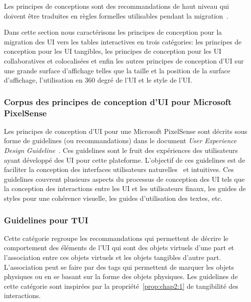 
Les principes de conceptions sont des recommandations de haut niveau qui doivent être traduites en règles formelles utilisables pendant la migration~\cite{Vanderdonckt1997}.

Dans cette section nous caractérisons les principes de conception pour la migration des UI vers les tables interactives en trois catégories: les principes de conception pour les UI tangibles, les principes de conception pour les UI collaboratives et colocalisées et enfin les autres principes de conception d'UI sur une grande surface d'affichage telles que la taille et la position de la surface d'affichage, l'utilisation en 360 degré de l'UI et le style de l'UI.

\subsubsection{Corpus des principes de conception d'UI pour Microsoft PixelSense}
\label{sec:chap2:3:5:1}
Les principes de conception d'UI pour une Microsoft PixelSense sont décrits sous forme de guidelines (ou recommandations) dans le document \textit{User Experience Design Guideline}~\cite{Microsoft2011}. Ces guidelines sont le fruit des expériences des utilisateurs ayant développé des UI pour cette plateforme. L'objectif de ces guidelines est de faciliter la conception des interfaces utilisateurs naturelles~\cite{Steinberg2012} et intuitives. Ces guidelines couvrent plusieurs aspects du processus de conception des UI tels que la conception des interactions entre les UI et les utilisateurs finaux, les guides de styles pour une cohérence visuelle, les guides d'utilisation des textes, etc. 

\subsubsection{Guidelines pour TUI}
\label{sec:chap2:3:5:2}
Cette catégorie regroupe les recommandations qui permettent de décrire le comportement des éléments de l'UI qui sont des objets virtuels d'une part et l'association entre ces objets virtuels et les objets tangibles d'autre part. L'association peut se faire par des tags qui permettent de marquer les objets physiques ou en se basant sur la forme des objets physiques. Les guidelines de cette catégorie sont inspirées par la propriété~\ref{prop:chap2:1} de tangibilité des interactions.


